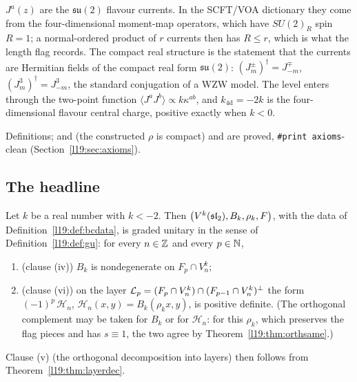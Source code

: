 \begin{physics}
$J^a(z)$ are the $\mathfrak{su}(2)$ flavour currents. In the SCFT/VOA dictionary they come from the
four-dimensional moment-map operators, which have $SU(2)_R$ spin $R = 1$; a normal-ordered product of $r$ currents
then has $R\le r$, which is what the length flag records. The compact real structure is the statement that
the currents are Hermitian fields of the compact real form $\mathfrak{su}(2)$: $(J^\pm_m)^\dagger = J^\mp_{-m}$,
$(J^3_m)^\dagger = J^3_{-m}$, the standard conjugation of a WZW model. The level enters through the two-point
function $\langle J^a J^b\rangle\propto k\kappa^{ab}$, and $k_{\mathrm{4d}} = -2k$ is the four-dimensional flavour
central charge, positive exactly when $k<0$.
\end{physics}

\begin{status}
Definitions;  and  (the constructed $\rho$
is compact) and  are proved, \texttt{\#print axioms}-clean
(Section~\ref{l19:sec:axioms}).
\end{status}

\subsection{The headline}

\begin{theorem}\label{l19:thm:bcheadline}
Let $k$ be a real number with $k<-2$. Then $\bigl(V^k(\mathfrak{sl}_2),B_k,\rho_k,F\bigr)$, with the data of
Definition~\ref{l19:def:bcdata}, is graded unitary in the sense of Definition~\ref{l19:def:gu}: for every
$n\in{\mathbb{Z}}$ and every $p\in{\mathbb{N}}$,
\begin{enumerate}
\item (clause (iv)) $B_k$ is nondegenerate on $F_p\cap V^k_n$;
\item (clause (vi)) on the layer $\mathcal{L}_p = (F_p\cap V^k_n)\cap(F_{p-1}\cap V^k_n)^{\perp}$ the form
  $(-1)^p\,\mathcal H_n$, $\mathcal H_n(x,y) = B_k(\rho_kx,y)$, is positive definite. (The orthogonal complement may be
  taken for $B_k$ or for $\mathcal H_n$: for this $\rho_k$, which preserves the flag pieces and has $s\equiv1$, the two
  agree by Theorem~\ref{l19:thm:orthsame}.)
\end{enumerate}
Clause (v) (the orthogonal decomposition into layers) then follows from Theorem~\ref{l19:thm:layerdec}.
\end{theorem}

